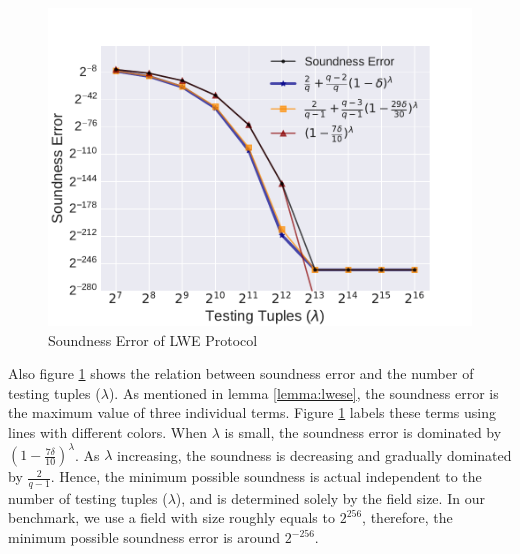 \begin{figure}[h]
    \centering
    \includegraphics[width=1\textwidth]{graph/se.pdf}
    \caption{Soundness Error of LWE Protocol}
    \label{fig:se}
\end{figure}

Also figure \ref{fig:se} shows the relation between soundness error and the number of testing tuples ($\lambda$). As mentioned in lemma \ref{lemma:lwese}, the soundness error is the maximum value of three individual terms. Figure \ref{fig:se} labels these terms using lines with different colors. When $\lambda$ is small, the soundness error is dominated by $(1 - \frac{7\delta}{10})^\lambda$.
As $\lambda$ increasing, the soundness is decreasing and gradually dominated by $\frac{2}{q-1}$. Hence, the minimum possible soundness is actual independent to the number of testing tuples ($\lambda$), and is determined solely by the field size. In our benchmark, we use a field with size roughly equals to $2^{256}$, therefore, the minimum possible soundness error is around $2^{-256}$.
